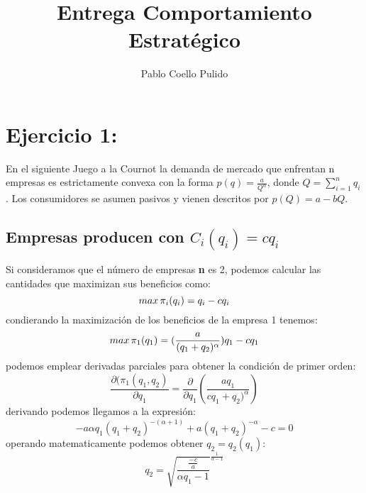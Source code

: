 \documentclass{article}
\title{Entrega Comportamiento Estrat\'egico}
\author{Pablo Coello Pulido\\
}
\theoremstyle{definition}
\theoremstyle{remark}
\begin{document}
\maketitle


\section{Ejercicio 1:}

En el siguiente Juego a la Cournot la demanda de mercado que enfrentan n empresas es estrictamente convexa con la forma
$p(q)=\frac{a}{Q^\alpha}$, donde $Q=\sum_{i=1}^n q_i$. Los consumidores se asumen pasivos y vienen descritos por $p(Q)=a-bQ$.
\subsection{Empresas producen con $C_i(q_i)=cq_i$}
Si consideramos que el n\'umero de empresas \textbf{n} es 2, podemos calcular las cantidades que maximizan sus beneficios como:
 $$max\thinspace \pi_i(q_i)=q_i-cq_i$$
 condierando la maximizaci\'on de los beneficios de la empresa 1 tenemos:
 $$max\thinspace \pi_1(q_1)=(\frac{a}{(q_1+q_2)^\alpha})q_1-cq_1$$
podemos emplear derivadas parciales para obtener la condici\'on de primer orden:
  $$\frac{\partial(\pi_1(q_1,q_2)}{\partial q_1} = \frac{\partial}{\partial q_1} (\frac{aq_1}{cq_1+q_2)^\alpha})$$
  derivando podemos llegamos a la expresi\'on:
  $$-a\alpha q_1(q_1+q_2)^{-(\alpha+1)}+a(q_1+q_2)^{-\alpha}-c=0$$
  operando matematicamente podemos obtener $q_2=q_2(q_1)$:
  $$q_2=\sqrt{\frac{\frac{-c}{a}}{\alpha q_1-1}}^{\frac{1}{\alpha-1}}$$
  
  
\end{document}
